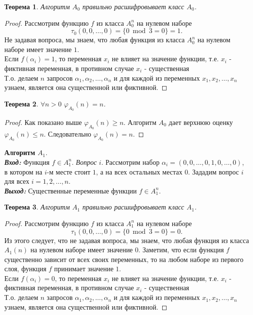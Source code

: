 \documentclass[oneside, final, 14pt]{extreport}
\newtheorem{thm}{Теорема}
\begin{document}
	 \begin{thm} 
	 	Алгоритм $A_0$ правильно расшифровывает класс $A_0$. 
	 \end{thm}
	 \begin{proof}
	 	Рассмотрим функцию $f$  из класса $A_0^n$ на нулевом наборе
	 	\[
	 	\tau_0(0, 0, \ldots, 0) =  \{0  \bmod 3 = 0\} = 1.
	 	\]
	 	Не задавая вопроса, мы знаем, что любая функция из класса $A_0^n$ на нулевом наборе имеет значение $1$.\\
	 	Если $f(\alpha_i) = 1$, то переменная $x_i$ не влияет на значение функции, т.е. $x_i$ - 
	 	фиктивная переменная, в противном случае $x_i$ - существенная \\
	 	Т.о. делаем $n$  запросов $\alpha_1, \alpha_2, \ldots, \alpha_n$ и для каждой из переменных $x_1, x_2, \ldots, x_n$ узнаем, является она существенной 
	 	или фиктивной. 
	 \end{proof} \par
	 
	\begin{thm} 
		$\forall n>0$  $\varphi_{A_0}(n) = n$.
	\end{thm}
	\begin{proof}
		Как показано выше $\varphi_{A_0}(n) \geq n$. Алгоритм $A_0$ дает верхнюю оценку $\varphi_{A_0}(n) \leq n$. Следовательно 
		$\varphi_{A_0}(n) = n$.
	\end{proof} \par
	\noindent\textbf{Алгоритм $A_1$}. \\
	\emph{\textbf{Вход:}} Функция $f \in A_1^n$.
	\emph{Вопрос} $i$. Рассмотрим набор $\alpha_i = (0, 0,  \ldots, 0, 1, 0, \ldots, 0)$, в котором на $i$-м месте стоит $1$, а на всех остальных местах $0$.
	Зададим вопрос $i$ для всех $i = 1, 2, \ldots, n$. \\ 
	\emph{\textbf{Выход:}} Существенные переменные функции $f \in A_1^n$.
	
	\begin{thm} 
		Алгоритм $A_1$ правильно расшифровывает класс $A_1$. 
	\end{thm}
	\begin{proof}
		Рассмотрим функцию $f$  из класса $A_1^n$ на нулевом наборе
		\[
		\tau_1(0, 0, \ldots, 0) =  \{0 \bmod  3 = 0\} = 0.
		\]
		Из этого следует, что не задавая вопроса, мы знаем, что любая функция из класса $A_1(n)$ на нулевом наборе имеет значение $0$.
		Заметим, что если функция $f$ существенно зависит от всех своих переменных, то на любом наборе из первого слоя, функция $f$ принимает
		значение $1$.\\
		Если $f(\alpha_i) = 0$, то переменная $x_i$ не влияет на значение функции, т.е. $x_i$ - 
		фиктивная переменная, в противном случае $x_i$ - существенная \\
		Т.о. делаем $n$  запросов $\alpha_1, \alpha_2, \ldots, \alpha_n$ и для каждой из переменных $x_1, x_2, \ldots, x_n$ узнаем, является она существенной 
		или фиктивной.
	\end{proof} \par
	
\end{document}
